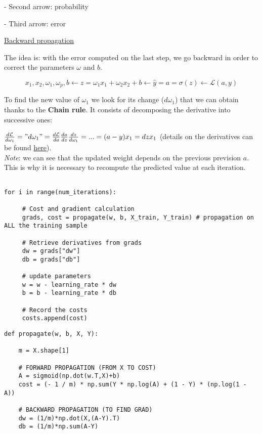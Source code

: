 - Second arrow: probability

- Third arrow: error

\vspace{5mm}

\underline{Backward propagation}

The idea is: with the error computed on the last step, we go backward in order to correct the parameters $\omega$ and $b$.

$$x_1,x_2, \omega_1,\omega_p,b \leftarrow z=\omega_1x_1 + \omega_2x_2 + b \leftarrow \widehat{y}=a=\sigma(z) \leftarrow \mathcal{L}(a,y)$$

To find the new value of $\omega_1$ we look for its change ($d \omega_1$) that we can obtain thanks to the \textbf{Chain rule}. It consists of decomposing the derivative into successive ones:

$\frac{d\mathcal{L}}{d\omega_1}="d\omega_1"=\frac{d\mathcal{L}}{da}\frac{da}{dz}\frac{dz}{d\omega_1}=...=(a-y)x_1=dzx_1$ (details on the derivatives can be found \href{https://www.youtube.com/watch?v=z_xiwjEdAC4}{here}). \\

\textit{Note}: we can see that the updated weight depends on the previous prevision $a$. This is why it is necessary to recompute the predicted value at each iteration.

\lstset{language=Python}
\lstset{frame=lines}
\lstset{basicstyle=\footnotesize}
\begin{lstlisting}

for i in range(num_iterations):
        
     # Cost and gradient calculation
     grads, cost = propagate(w, b, X_train, Y_train) # propagation on ALL the training sample
        
     # Retrieve derivatives from grads
     dw = grads["dw"]
     db = grads["db"]
        
     # update parameters
     w = w - learning_rate * dw
     b = b - learning_rate * db
        
     # Record the costs
     costs.append(cost)

\end{lstlisting}

\lstset{language=Python}
\lstset{frame=lines}
\lstset{basicstyle=\footnotesize}
\begin{lstlisting}
def propagate(w, b, X, Y):
    
    m = X.shape[1]
    
    # FORWARD PROPAGATION (FROM X TO COST)
    A = sigmoid(np.dot(w.T,X)+b)
    cost = (- 1 / m) * np.sum(Y * np.log(A) + (1 - Y) * (np.log(1 - A))
    
    # BACKWARD PROPAGATION (TO FIND GRAD)
    dw = (1/m)*np.dot(X,(A-Y).T)
    db = (1/m)*np.sum(A-Y)

\end{lstlisting}



\vspace{5mm}